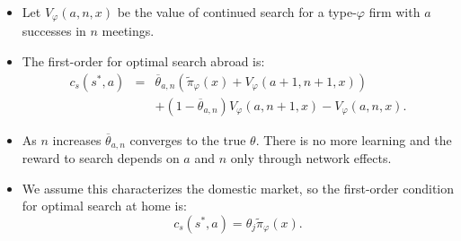 \documentclass[notes=show]{beamer}
\begin{document}
\begin{frame}%



\begin{itemize}
\item Let $V_{\varphi }(a,n,x)$ be the value of continued search for a type-$%
\varphi $ firm with $a$ successes in $n$ meetings.

\item The first-order for optimal search abroad is:%
\hyperref{}{}{optimal_search}{}%
\begin{eqnarray*}
c_{s}(s^{\ast },a) &=&\overline{\theta }_{a,n}(\widetilde{\pi }_{\varphi
}(x)+V_{\varphi }(a+1,n+1,x)) \\
&&+(1-\overline{\theta }_{a,n})V_{\varphi }(a,n+1,x)-V_{\varphi }(a,n,x).
\end{eqnarray*}
\end{itemize}

\end{frame}%
\begin{frame}%



\begin{itemize}
\item As $n$ increases $\overline{\theta }_{a,n}$ converges to the true $%
\theta .$ There is no more learning and the reward to search depends on $a$
and $n$ only through network effects.

\item We assume this characterizes the domestic market, so the first-order
condition for optimal search at home is:%
\[
c_{s}(s^{\ast },a)=\theta _{j}\widetilde{\pi }_{\varphi }(x). 
\]
\end{itemize}

\end{frame}%
\end{document}
